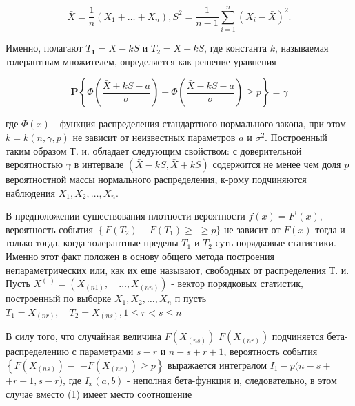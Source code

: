 \documentclass[10pt]{article}
\begin{document}
\[

\bar{X}=\frac{1}{n}\left(X_{1}+\ldots+X_{n}\right), S^{2}=\frac{1}{n-1} \sum_{i=1}^{n}\left(X_{i}-\bar{X}\right)^{2} .

\]



Именно, полагают $T_{\mathbf{1}}=\bar{X}-k S$ и $T_{2}=\bar{X}+k S$, где константа $k$, называемая толерантным множителем, определяется как решение уравнения



\[

\mathbf{P}\left\{\Phi\left(\frac{\bar{X}+k S-a}{\sigma}\right)-\Phi\left(\frac{\bar{X}-k S-a}{\sigma}\right) \geqslant p\right\}=\gamma

\]



где $\Phi(x)$ - функция распределения стандартного нормального закона, при этом $k=k(n, \gamma, p)$ не зависит от неизвестных параметров $a$ и $\sigma^{2}$. Построенный таким образом Т. и. обладает следующим свойством: с доверительной вероятностью $\gamma$ в интервале $(\bar{X}-k S, \bar{X}+k S)$ содержится не менее чем доля $p$ вероятностной массы нормального распределения, к-рому подчиняются наблюдения $X_{1}, X_{2}, \ldots, X_{n}$.



В предположении существования плотности вероятности $f(x)=F^{\prime}(x)$, вероятность события $\left\{F\left(T_{2}\right)-F\left(T_{1}\right) \geqslant\right.$ $\geqslant p\}$ не зависит от $F(x)$ тогда и только тогда, когда толерантные пределы $T_{1}$ и $T_{2}$ суть порядковые статистики. Именно этот факт положен в основу общего метода построения непараметрических или, как их еще называют, свободных от распределения Т. и. Пусть $X^{(\cdot)}=\left(X_{(n 1)}, \quad \ldots, X_{(n n)}\right)$ - вектор порядковых статистик, построенный по выборке $X_{1}, X_{2}, \ldots, X_{n}$ п пусть $T_{1}=X_{(n r)}, \quad T_{2}=X_{(n s)}, 1 \leqslant r<s \leqslant n$



В силу того, что случайная величина $F\left(X_{(n s)}\right)$ $F\left(X_{(n r)}\right)$ подчиняется бета-распределению с параметрами $s-r$ и $n-s+r+1$, вероятность события $\left\{F\left(X_{(n s)}\right)-\right.$ $\left.-F\left(X_{(n r)}\right) \geqslant p\right\}$ выражается интегралом $I_{1}-p(n-s+$ $+r+1, s-r)$, где $I_{x}(a, b)$ - неполная бета-функция и, следовательно, в этом случае вместо (1) имеет место соотношение
\end{document}
